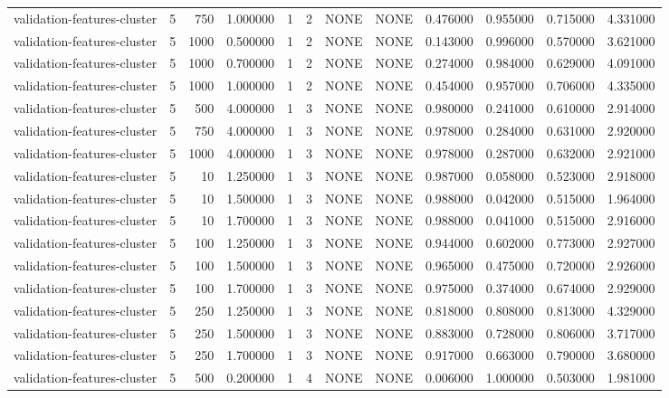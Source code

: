 \begin{tabular}{lrrrllllrrrr}
validation-features-cluster & 5 & 750 & 1.000000 & 1 & 2 & NONE & NONE & 0.476000 & 0.955000 & 0.715000 & 4.331000 \\
validation-features-cluster & 5 & 1000 & 0.500000 & 1 & 2 & NONE & NONE & 0.143000 & 0.996000 & 0.570000 & 3.621000 \\
validation-features-cluster & 5 & 1000 & 0.700000 & 1 & 2 & NONE & NONE & 0.274000 & 0.984000 & 0.629000 & 4.091000 \\
validation-features-cluster & 5 & 1000 & 1.000000 & 1 & 2 & NONE & NONE & 0.454000 & 0.957000 & 0.706000 & 4.335000 \\
validation-features-cluster & 5 & 500 & 4.000000 & 1 & 3 & NONE & NONE & 0.980000 & 0.241000 & 0.610000 & 2.914000 \\
validation-features-cluster & 5 & 750 & 4.000000 & 1 & 3 & NONE & NONE & 0.978000 & 0.284000 & 0.631000 & 2.920000 \\
validation-features-cluster & 5 & 1000 & 4.000000 & 1 & 3 & NONE & NONE & 0.978000 & 0.287000 & 0.632000 & 2.921000 \\
validation-features-cluster & 5 & 10 & 1.250000 & 1 & 3 & NONE & NONE & 0.987000 & 0.058000 & 0.523000 & 2.918000 \\
validation-features-cluster & 5 & 10 & 1.500000 & 1 & 3 & NONE & NONE & 0.988000 & 0.042000 & 0.515000 & 1.964000 \\
validation-features-cluster & 5 & 10 & 1.700000 & 1 & 3 & NONE & NONE & 0.988000 & 0.041000 & 0.515000 & 2.916000 \\
validation-features-cluster & 5 & 100 & 1.250000 & 1 & 3 & NONE & NONE & 0.944000 & 0.602000 & 0.773000 & 2.927000 \\
validation-features-cluster & 5 & 100 & 1.500000 & 1 & 3 & NONE & NONE & 0.965000 & 0.475000 & 0.720000 & 2.926000 \\
validation-features-cluster & 5 & 100 & 1.700000 & 1 & 3 & NONE & NONE & 0.975000 & 0.374000 & 0.674000 & 2.929000 \\
validation-features-cluster & 5 & 250 & 1.250000 & 1 & 3 & NONE & NONE & 0.818000 & 0.808000 & 0.813000 & 4.329000 \\
validation-features-cluster & 5 & 250 & 1.500000 & 1 & 3 & NONE & NONE & 0.883000 & 0.728000 & 0.806000 & 3.717000 \\
validation-features-cluster & 5 & 250 & 1.700000 & 1 & 3 & NONE & NONE & 0.917000 & 0.663000 & 0.790000 & 3.680000 \\
validation-features-cluster & 5 & 500 & 0.200000 & 1 & 4 & NONE & NONE & 0.006000 & 1.000000 & 0.503000 & 1.981000 \\

\end{tabular}

